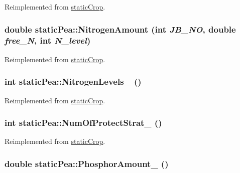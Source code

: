 Reimplemented from \hyperlink{classstatic_crop_a9b67ef1ae531a3afb32b63a4aeb5916b}{staticCrop}.\hypertarget{classstatic_pea_a617c3f2666334b3e86ad4ca3e105afc8}{
\subsubsection[{NitrogenAmount}]{\setlength{\rightskip}{0pt plus 5cm}double staticPea::NitrogenAmount (int {\em JB\_\-NO}, \/  double {\em free\_\-N}, \/  int {\em N\_\-level})}}
\label{classstatic_pea_a617c3f2666334b3e86ad4ca3e105afc8}


Reimplemented from \hyperlink{classstatic_crop_af3aa85321a8a75406f8a0751b71587d0}{staticCrop}.\hypertarget{classstatic_pea_ac4186d94b140bb10e0817f4273ae4f9d}{
\subsubsection[{NitrogenLevels\_\-}]{\setlength{\rightskip}{0pt plus 5cm}int staticPea::NitrogenLevels\_\- ()}}
\label{classstatic_pea_ac4186d94b140bb10e0817f4273ae4f9d}


Reimplemented from \hyperlink{classstatic_crop_a32b69ed138beaed150efa74d18e82d8e}{staticCrop}.\hypertarget{classstatic_pea_a9ce174ccebfdb6f1494b5cbc8ed26e65}{
\subsubsection[{NumOfProtectStrat\_\-}]{\setlength{\rightskip}{0pt plus 5cm}int staticPea::NumOfProtectStrat\_\- ()}}
\label{classstatic_pea_a9ce174ccebfdb6f1494b5cbc8ed26e65}


Reimplemented from \hyperlink{classstatic_crop_a4d3d767f569f48eb68ffa76822302467}{staticCrop}.\hypertarget{classstatic_pea_a8142c951a5471b430813637a7a21e7d7}{
\subsubsection[{PhosphorAmount\_\-}]{\setlength{\rightskip}{0pt plus 5cm}double staticPea::PhosphorAmount\_\- ()}}
\label{classstatic_pea_a8142c951a5471b430813637a7a21e7d7}


